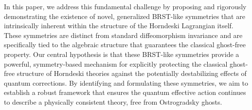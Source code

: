 \documentclass[twocolumn]{aastex631}
\begin{document}
In this paper, we address this fundamental challenge by proposing and rigorously demonstrating the existence of novel, generalized BRST-like symmetries that are intrinsically inherent within the structure of the Horndeski Lagrangian itself. These symmetries are distinct from standard diffeomorphism invariance and are specifically tied to the algebraic structure that guarantees the classical ghost-free property. Our central hypothesis is that these BRST-like symmetries provide a powerful, symmetry-based mechanism for explicitly protecting the classical ghost-free structure of Horndeski theories against the potentially destabilizing effects of quantum corrections. By identifying and formulating these symmetries, we aim to establish a robust framework that ensures the quantum effective action continues to describe a physically consistent theory, free from Ostrogradsky ghosts.
\end{document}
